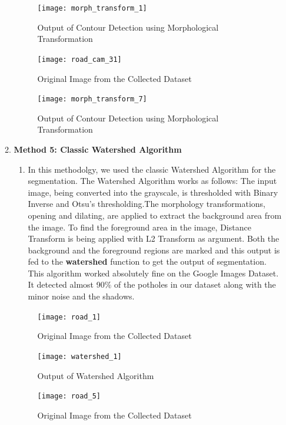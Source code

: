 \documentclass[12pt,a4paper]{article}
\begin{document}
\begin{enumerate}
\begin{enumerate}
    \begin{figure}[ht!]
        \centering
        \texttt{[image: morph\_transform\_1]}
        \caption{Output of Contour Detection using Morphological Transformation}
    \end{figure}
    \pagebreak
    
    \begin{figure}[ht!]
        \centering
        \texttt{[image: road\_cam\_31]}
        \caption{Original Image from the Collected Dataset}
    \end{figure}

    \begin{figure}[ht!]
        \centering
        \texttt{[image: morph\_transform\_7]}
        \caption{Output of Contour Detection using Morphological Transformation}
    \end{figure}
    \pagebreak
    
    \item \textbf{Method 5: Classic Watershed Algorithm}
    \begin{enumerate}
        \item In this methodolgy, we used the classic Watershed Algorithm for the segmentation. The Watershed Algorithm works as follows: The input image, being converted into the grayscale, is thresholded with Binary Inverse and Otsu's thresholding.The morphology transformations, opening and dilating, are applied to extract the background area from the image. To find the foreground area in the image, Distance Transform is being applied with L2 Transform as argument. Both the background and the foreground regions are marked and this output is fed to the \textbf{watershed} function to get the output of segmentation. This algorithm worked absolutely fine on the Google Images Dataset. It detected almost 90$\%$ of the potholes in our dataset along with the minor noise and the shadows.
    \end{enumerate}
    \begin{figure}[ht!]
        \centering
        \texttt{[image: road\_1]}
        \caption{Original Image from the Collected Dataset}
    \end{figure}

    \begin{figure}[ht!]
        \centering
        \texttt{[image: watershed\_1]}
        \caption{Output of Watershed Algorithm}
    \end{figure}
    \pagebreak
    
    \begin{figure}[ht!]
        \centering
        \texttt{[image: road\_5]}
        \caption{Original Image from the Collected Dataset}
    \end{figure}


\end{enumerate}
\end{enumerate}
\end{document}
